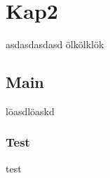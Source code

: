 \chapter{Kap2}
asdasdasdasd\cite{:ae}
ölkölklök\cite{Abubakar:2016aa}
\section{Main}
löasdlöaskd
\subsection{Test}
test
